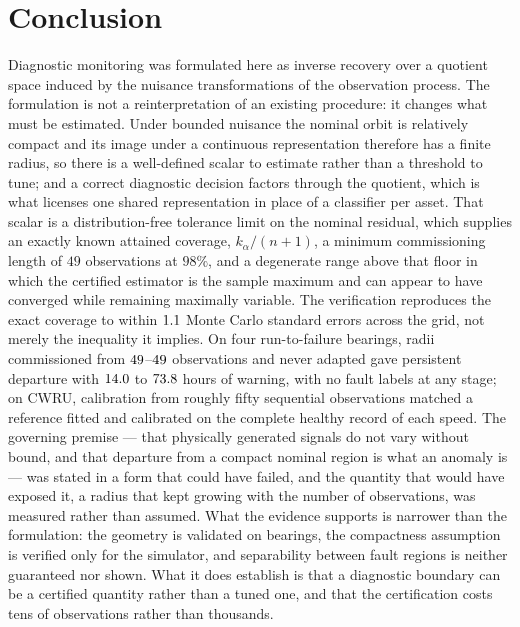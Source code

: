 \documentclass[a4paper]{cas-sc}
\begin{document}
\section{Conclusion}
\label{sec:conclusion}

Diagnostic monitoring was formulated here as inverse recovery over a quotient
space induced by the nuisance transformations of the observation process. The
formulation is not a reinterpretation of an existing procedure: it changes
what must be estimated. Under bounded nuisance the nominal orbit is relatively
compact and its image under a continuous representation therefore has a finite
radius, so there is a well-defined scalar to estimate rather than a threshold
to tune; and a correct diagnostic decision factors through the quotient, which
is what licenses one shared representation in place of a classifier per asset.
That scalar is a distribution-free tolerance limit on the nominal residual,
which supplies an exactly known attained coverage,
\(k_\alpha/(n+1)\), a minimum commissioning length of \(49\) observations at
\(98\%\), and a degenerate range above that floor in which the certified
estimator is the sample maximum and can appear to have converged while
remaining maximally variable. The verification reproduces the exact coverage
to within \(1.1\) Monte Carlo standard errors across the grid, not
merely the inequality it implies. On four run-to-failure bearings, radii
commissioned from \(49\)--\(49\) observations and never
adapted gave persistent departure with \(14.0\) to \(73.8\)
hours of warning, with no fault labels at any stage; on CWRU, calibration from
roughly fifty sequential observations matched a reference fitted and
calibrated on the complete healthy record of each speed. The governing premise
--- that physically generated signals do not vary without bound, and that
departure from a compact nominal region is what an anomaly is --- was stated in
a form that could have failed, and the quantity that would have exposed it,
a radius that kept growing with the number of observations, was measured
rather than assumed. What the evidence supports is narrower than the
formulation: the geometry is validated on bearings, the compactness assumption
is verified only for the simulator, and separability between fault regions is
neither guaranteed nor shown. What it does establish is that a diagnostic
boundary can be a certified quantity rather than a tuned one, and that the
certification costs tens of observations rather than thousands.
\end{document}
